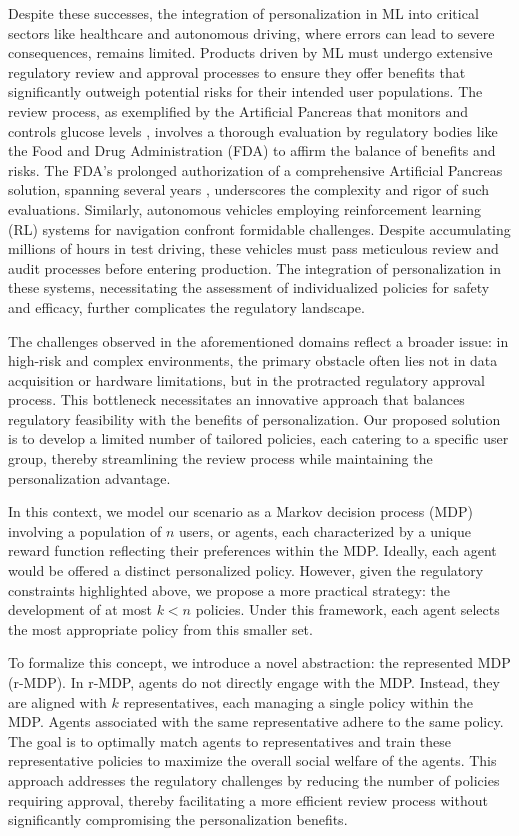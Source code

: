 \documentclass[letterpaper]{article} %
\begin{document}
Despite these successes, the integration of personalization in ML into critical sectors like healthcare and autonomous driving, where errors can lead to severe consequences, remains limited. Products driven by ML must undergo extensive regulatory review and approval processes to ensure they offer benefits that significantly outweigh potential risks for their intended user populations. The review process, as exemplified by the Artificial Pancreas that monitors and controls glucose levels \cite{breton2020randomized}, involves a thorough evaluation by regulatory bodies like the Food and Drug Administration (FDA) to affirm the balance of benefits and risks. The FDA's prolonged authorization of a comprehensive Artificial Pancreas solution, spanning several years \cite{jdrf_blog_2022}, underscores the complexity and rigor of such evaluations. Similarly, autonomous vehicles employing reinforcement learning (RL) systems for navigation confront formidable challenges. Despite accumulating millions of hours in test driving, these vehicles must pass meticulous review and audit processes before entering production. The integration of personalization in these systems, necessitating the assessment of individualized policies for safety and efficacy, further complicates the regulatory landscape.

The challenges observed in the aforementioned domains reflect a broader issue: in high-risk and complex environments, the primary obstacle often lies not in data acquisition or hardware limitations, but in the protracted regulatory approval process. This bottleneck necessitates an innovative approach that balances regulatory feasibility with the benefits of personalization. Our proposed solution is to develop a limited number of tailored policies, each catering to a specific user group, thereby streamlining the review process while maintaining the personalization advantage.

In this context, we model our scenario as a Markov decision process (MDP) involving a population of $n$ users, or agents, each characterized by a unique reward function reflecting their preferences within the MDP. Ideally, each agent would be offered a distinct personalized policy. However, given the regulatory constraints highlighted above, we propose a more practical strategy: the development of at most $k<n$ policies. Under this framework, each agent selects the most appropriate policy from this smaller set.

To formalize this concept, we introduce a novel abstraction: the represented MDP (r-MDP). In r-MDP, agents do not directly engage with the MDP. Instead, they are aligned with $k$ representatives, each managing a single policy within the MDP. Agents associated with the same representative adhere to the same policy. The goal is to optimally match agents to representatives and train these representative policies to maximize the overall social welfare of the agents. This approach addresses the regulatory challenges by reducing the number of policies requiring approval, thereby facilitating a more efficient review process without significantly compromising the personalization benefits.
\end{document}
